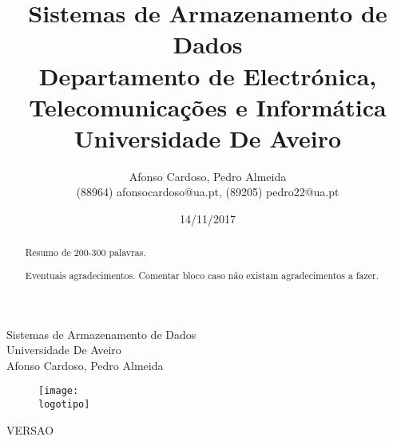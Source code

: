 \documentclass{report}
\begin{document}
%
\def\titulo{Sistemas de Armazenamento de Dados}
\def\data{14/11/2017}
\def\autores{Afonso Cardoso, Pedro Almeida}
\def\autorescontactos{(88964) afonsocardoso@ua.pt, (89205) pedro22@ua.pt}
\def\versao{VERSAO}
\def\departamento{Departamento de Electrónica, Telecomunicações e Informática}
\def\empresa{Universidade De Aveiro}
\def\logotipo{ua.pdf}
%
%
\begin{titlepage}

\begin{center}
%
\vspace*{50mm}
%
{\Huge \titulo}\\ 
%
\vspace{10mm}
%
{\Large \empresa}\\
%
\vspace{10mm}
%
{\LARGE \autores}\\ 
%
\vspace{30mm}
%
\begin{figure}[h]
\center
\texttt{[image: \\logotipo]}
\end{figure}
%
\vspace{30mm}
\end{center}
%
\begin{flushright}
\versao
\end{flushright}
\end{titlepage}

\title{%
{\Huge\textbf{\titulo}}\\
{\Large \departamento\\ \empresa}
}
%
\author{%
    \autores \\
    \autorescontactos
}
%
\date{\data}
%
\maketitle


\begin{abstract}
Resumo de 200-300 palavras.
\end{abstract}

\renewcommand{\abstractname}{Agradecimentos}
\begin{abstract}
Eventuais agradecimentos.
Comentar bloco caso não existam agradecimentos a fazer.
\end{abstract}

\tableofcontents
\end{document}
